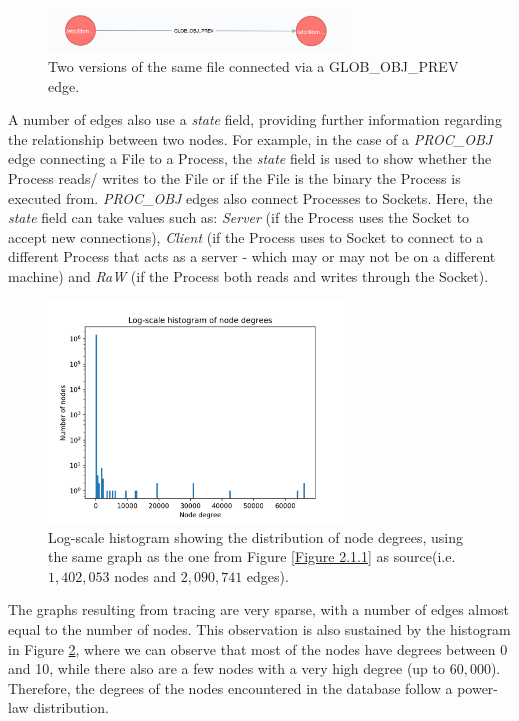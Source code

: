	\begin{figure}[H]
		\centering

		\includegraphics[width=0.7\textwidth]{graphics/GLOB_OBJ_PREV}
		\caption{
			Two versions of the same file connected via a GLOB\_OBJ\_PREV edge.
		}
		\label{Figure 2.1.2}
	\end{figure}
	A number of edges also use a \textit{state} field, providing further information regarding the relationship between two nodes. For example, in the case of a \textit{PROC\_OBJ} edge connecting a File to a Process, the \textit{state} field is used to show whether the Process reads/ writes to the File or if the File is the binary the Process is executed from. \textit{PROC\_OBJ} edges also connect Processes to Sockets. Here, the \textit{state} field can take values such as: \textit{Server} (if the Process uses the Socket to accept new connections), \textit{Client} (if the Process uses to Socket to connect to a different Process that acts as a server - which may or may not be on a different machine)  and \textit{RaW} (if the Process both reads and writes through the Socket).
	\begin{figure}[H]
		\centering
		
		\includegraphics[width=0.7\textwidth]{graphics/node_degree_hist}
		\caption[Log-scale distribution of node degrees]{
			Log-scale histogram showing the distribution of node degrees, using the same graph as the one from Figure \ref{Figure 2.1.1} as source(i.e. $1,402,053$ nodes and $2,090,741$ edges).
		}
		\label{Figure 2.1.3}
	\end{figure}
	 
	 The graphs resulting from tracing are very sparse, with a number of edges almost equal to the number of nodes. This observation is also sustained by the histogram in Figure \ref{Figure 2.1.3}, where we can observe that most of the nodes have degrees between 0 and 10, while there also are a few nodes with a very high degree (up to $60, 000$). Therefore, the degrees of the nodes encountered in the database follow a power-law distribution\cite{Clauset:2009:PDE:1655787.1655789}.
	 
